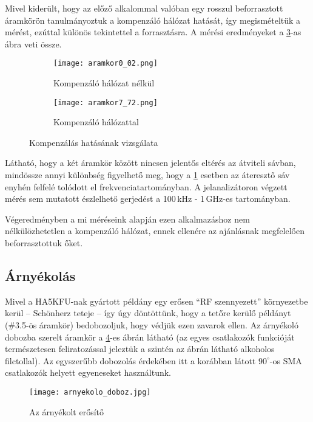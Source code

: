 Mivel kiderült, hogy az előző alkalommal valóban egy rosszul beforrasztott áramkörön tanulmányoztuk a kompenzáló hálózat hatását, így megismételtük a mérést, ezúttal különös tekintettel a forrasztásra. A mérési eredményeket a \ref{fig:kompenzalo_halozat}-as ábra veti össze.

\begin{figure}[!ht]
	\centering
	\begin{subfigure}[b]{\textwidth}
		\texttt{[image: aramkor0\_02.png]}
		\caption{Kompenzáló hálózat nélkül}
		\label{fig:erosito0}
	\end{subfigure}
	\begin{subfigure}[b]{\textwidth}
		\texttt{[image: aramkor7\_72.png]}
		\caption{Kompenzáló hálózattal}
		\label{fig:erosito7}
	\end{subfigure}
	\caption{Kompenzálás hatásának vizsgálata}
	\label{fig:kompenzalo_halozat}
\end{figure}

Látható, hogy a két áramkör között nincsen jelentős eltérés az átviteli sávban, mindössze annyi különbség figyelhető meg, hogy a \ref{fig:erosito0} esetben az áteresztő sáv enyhén felfelé tolódott el frekvenciatartományban. A jelanalizátoron végzett mérés sem mutatott észlelhető gerjedést a 100\,kHz - 1\,GHz-es tartományban.

Végeredményben a mi méréseink alapján ezen alkalmazáshoz nem nélkülözhetetlen a kompenzáló hálózat, ennek ellenére az ajánlásnak megfelelően beforrasztottuk őket.


\subsection{Árnyékolás}
\label{subsec:arnyekolas}

Mivel a HA5KFU-nak gyártott példány egy erősen \enquote{RF szennyezett} környezetbe kerül -- Schönherz teteje -- így úgy döntöttünk, hogy a tetőre kerülő példányt (\#3.5-ös áramkör) bedobozoljuk, hogy védjük ezen zavarok ellen. Az árnyékoló dobozba\cite{doboz} szerelt áramkör a \ref{fig:arnyekolas}-es ábrán látható (az egyes csatlakozók funkcióját természetesen feliratozással jeleztük a szintén az ábrán látható alkoholos filctollal). Az egyszerűbb dobozolás érdekében itt a korábban látott $90^{\circ}$-os SMA csatlakozók helyett egyeneseket használtunk\cite{egyenes_SMA}.

\begin{figure}[!ht]
	\centering
	\texttt{[image: arnyekolo\_doboz.jpg]}
	\caption{Az árnyékolt erősítő}
	\label{fig:arnyekolas}
\end{figure}

